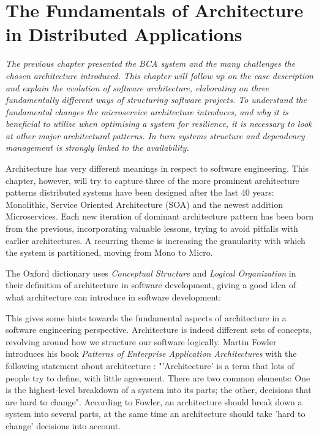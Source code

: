 \chapter{The Fundamentals of Architecture in Distributed Applications}
\label{ch:architecture}

\textit{The previous chapter presented the BCA system and the many challenges the chosen architecture introduced. This chapter will follow up on the case description and explain the evolution of software architecture, elaborating on three fundamentally different ways of structuring software projects. To understand the fundamental changes the microservice architecture introduces, and why it is beneficial to utilize when optimising a system for resilience, it is necessary to look at other major architectural patterns. In turn systems structure and dependency management is strongly linked to the availability.}

Architecture has very different meanings in respect to software engineering. This chapter, however, will try to capture three of the more prominent architecture patterns distributed systems have been designed after the last 40 years: Monolithic, Service Oriented Architecture (SOA) and the newest addition Microservices. Each new iteration of dominant architecture pattern has been born from the previous, incorporating valuable lessons, trying to avoid pitfalls with earlier architectures. A recurring theme is increasing the granularity with which the system is partitioned, moving from Mono to Micro.

The Oxford dictionary uses \textit{Conceptual Structure} and \textit{Logical Organization} in their definition of architecture in software development, giving a good idea of what architecture can introduce in software development:
\newpage

 
This gives some hints towards the fundamental aspects of architecture in a software engineering perspective. Architecture is indeed different sets of concepts, revolving around how we structure our software logically. Martin Fowler introduces his book \textit{Patterns of Enterprise Application Architectures} with the following statement about architecture \cite[p.~1]{fowler2002patterns}: "'Architecture' is a term that lots of people try to define, with little agreement. There are two common elements: One is the highest-level breakdown of a system into its parts; the other, decisions that are hard to change". According to Fowler, an architecture should break down a system into several parts, at the same time an architecture should take 'hard to change' decisions into account. 

